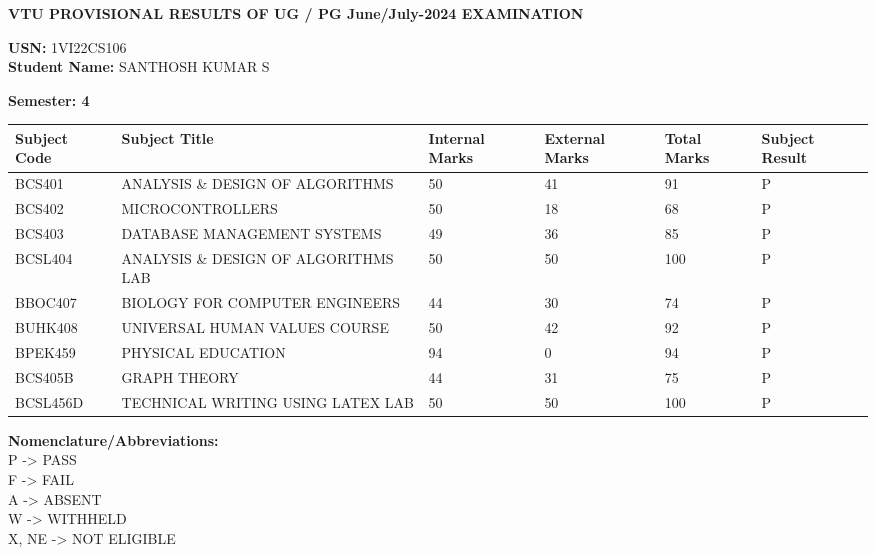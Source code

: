 \documentclass[a4paper,12pt]{article}
\begin{document}
\begin{center}
    \textbf{VTU PROVISIONAL RESULTS OF UG / PG June/July-2024 EXAMINATION}
\end{center}

\vspace{0.5cm}

\noindent
\textbf{USN:} 1VI22CS106 \\
\textbf{Student Name:} SANTHOSH KUMAR S

\vspace{0.5cm}

\noindent
\textbf{Semester: 4}

\vspace{0.5cm}

\begin{tabular}{|m{3cm}|m{7cm}|m{2cm}|m{2cm}|m{2cm}|m{2cm}|}
    \hline
    \textbf{Subject Code} & \textbf{Subject Title} & \textbf{Internal Marks} & \textbf{External Marks} & \textbf{Total Marks} & \textbf{Subject Result} \\
    \hline
    BCS401 & ANALYSIS \& DESIGN OF ALGORITHMS & 50 & 41 & 91 & P \\
    \hline
    BCS402 & MICROCONTROLLERS & 50 & 18 & 68 & P \\
    \hline
    BCS403 & DATABASE MANAGEMENT SYSTEMS & 49 & 36 & 85 & P \\
    \hline
    BCSL404 & ANALYSIS \& DESIGN OF ALGORITHMS LAB & 50 & 50 & 100 & P \\
    \hline
    BBOC407 & BIOLOGY FOR COMPUTER ENGINEERS & 44 & 30 & 74 & P \\
    \hline
    BUHK408 & UNIVERSAL HUMAN VALUES COURSE & 50 & 42 & 92 & P \\
    \hline
    BPEK459 & PHYSICAL EDUCATION & 94 & 0 & 94 & P \\
    \hline
    BCS405B & GRAPH THEORY & 44 & 31 & 75 & P \\
    \hline
    BCSL456D & TECHNICAL WRITING USING LATEX LAB & 50 & 50 & 100 & P \\
    \hline
\end{tabular}

\vspace{1cm}

\noindent
\textbf{Nomenclature/Abbreviations:} \\
P -> PASS \\
F -> FAIL \\
A -> ABSENT \\
W -> WITHHELD \\
X, NE -> NOT ELIGIBLE
\end{document}
